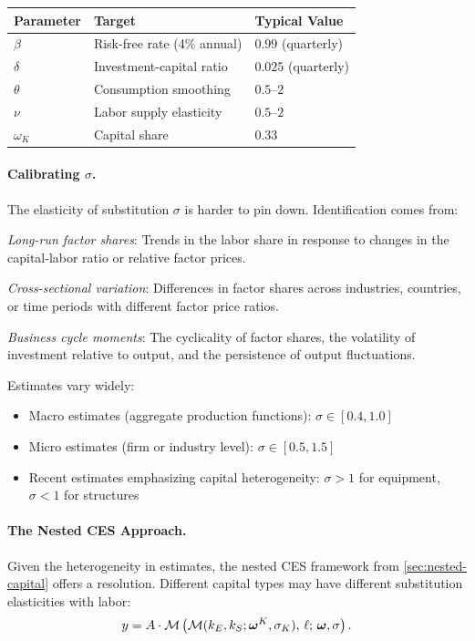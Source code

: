 \begin{center}
\renewcommand{\arraystretch}{1.3}
\begin{tabular}{@{}lll@{}}
\toprule
\textbf{Parameter} & \textbf{Target} & \textbf{Typical Value} \\
\midrule
$\beta$ & Risk-free rate (4\% annual) & $0.99$ (quarterly) \\
$\delta$ & Investment-capital ratio & $0.025$ (quarterly) \\
$\theta$ & Consumption smoothing & $0.5$--$2$ \\
$\nu$ & Labor supply elasticity & $0.5$--$2$ \\
$\omega_K$ & Capital share & $0.33$ \\
\bottomrule
\end{tabular}
\end{center}

\paragraph{Calibrating $\sigma$.}
The elasticity of substitution $\sigma$ is harder to pin down. Identification comes from:

\textit{Long-run factor shares}: Trends in the labor share in response to changes in the capital-labor ratio or relative factor prices.

\textit{Cross-sectional variation}: Differences in factor shares across industries, countries, or time periods with different factor price ratios.

\textit{Business cycle moments}: The cyclicality of factor shares, the volatility of investment relative to output, and the persistence of output fluctuations.

Estimates vary widely:
\begin{itemize}[nosep]
\item Macro estimates (aggregate production functions): $\sigma \in [0.4, 1.0]$
\item Micro estimates (firm or industry level): $\sigma \in [0.5, 1.5]$
\item Recent estimates emphasizing capital heterogeneity: $\sigma > 1$ for equipment, $\sigma < 1$ for structures
\end{itemize}

\paragraph{The Nested CES Approach.}
Given the heterogeneity in estimates, the nested CES framework from \cref{sec:nested-capital} offers a resolution. Different capital types may have different substitution elasticities with labor:
\begin{equation}
y = A \cdot \mathcal{M}\left( \mathcal{M}(k_E, k_S; \boldsymbol{\omega}^K, \sigma_K), \, \ell; \, \boldsymbol{\omega}, \sigma \right).
\label{eq:nested-rbc}
\end{equation}


